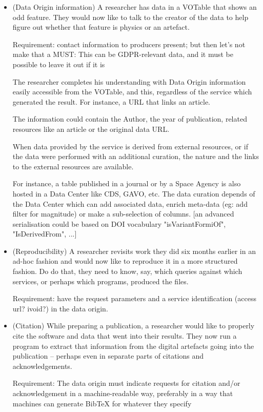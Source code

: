 \documentclass[11pt,a4paper]{ivoa}
\begin{document}
\begin{itemize}
	\item (Data Origin information) A researcher has data in a VOTable that shows an odd feature. They would now like to talk to the creator of the data to help figure out whether that feature is physics or an artefact. 
	
	Requirement: contact information to producers present; but then let's not make that a MUST: This can be GDPR-relevant data, and it must be possible to leave it out if it is
	
	The researcher completes his understanding with Data Origin information easily accessible from the VOTable, and this, regardless of the service which generated the result. For instance, a URL that links an article. 
	
	The information could contain the Author, the year of publication, related resources like an article or the original data URL.
	
	When data provided by the service is derived from external resources, or if the data were performed with an additional curation, the nature and the links to the external resources are available.
	
	For instance, a table published in a journal or by a Space Agency is also hosted in a Data Center like CDS, GAVO, etc. The data curation depends of the Data Center which can add associated data, enrich meta-data (eg: add filter for magnitude) or make a sub-selection of columns. [an advanced serialisation could be based on DOI vocabulary "isVariantFormiOf", "IsDerivedFrom", ...]
	
	\item (Reproducibility) A researcher revisits work they did six months earlier in an ad-hoc fashion and would now like to reproduce it in a more structured fashion. Do do that, they need to know, say, which queries against which services, or perhaps which programs, produced the files. 
	
	Requirement: have the request parameters and a service identification (access url? ivoid?) in the data origin.
	
	\item (Citation) While preparing a publication, a researcher would like to properly cite the software and data that went into their results. They now run a program to extract that information from the digital artefacts going into the publication -- perhaps even in separate parts of citations and acknowledgements. 
	
	Requirement: The data origin must indicate requests for citation and/or acknowledgement in a machine-readable way, preferably in a way that machines can generate BibTeX for whatever they specify
	

\end{itemize}
\end{document}
